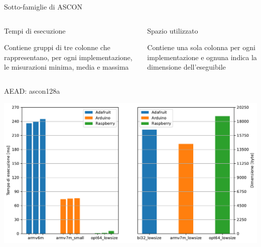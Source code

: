 \begin{frame}{Sotto-famiglie di ASCON}
    \begin{columns}

    \begin{column}{0.5\textwidth}
        \begin{block}{Tempi di esecuzione}
            \begin{center}
                Contiene gruppi di tre colonne che rappresentano, per ogni implementazione, le misurazioni minima, media e massima
            \end{center}
        \end{block}
    \end{column}

    \begin{column}{0.5\textwidth}
        \begin{block}{Spazio utilizzato}
            \begin{center}
                Contiene una sola colonna per ogni implementazione e ognuna indica la dimensione dell'eseguibile
            \end{center}
        \end{block}
    \end{column}
        
    \end{columns}

\end{frame}


\begin{frame}{AEAD: ascon128a}

    \begin{center}
        \includegraphics[height=0.40\textwidth]{images/analysis/aead.pdf}
    \end{center}
    
\end{frame}


